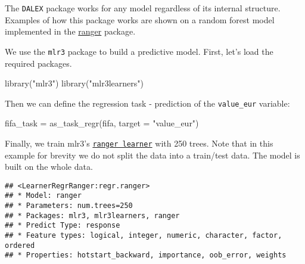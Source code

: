 \documentclass[
]{scrbook}
\newenvironment{Shaded}{\begin{snugshade}}{\end{snugshade}}
\newcommand{\AttributeTok}[1]{\textcolor[rgb]{0.77,0.63,0.00}{#1}}
\newcommand{\DecValTok}[1]{\textcolor[rgb]{0.00,0.00,0.81}{#1}}
\newcommand{\FunctionTok}[1]{\textcolor[rgb]{0.00,0.00,0.00}{#1}}
\newcommand{\NormalTok}[1]{#1}
\newcommand{\OtherTok}[1]{\textcolor[rgb]{0.56,0.35,0.01}{#1}}
\newcommand{\SpecialCharTok}[1]{\textcolor[rgb]{0.00,0.00,0.00}{#1}}
\newcommand{\StringTok}[1]{\textcolor[rgb]{0.31,0.60,0.02}{#1}}
\renewenvironment{Shaded} {\begin{snugshade}\small} {\end{snugshade}}
\begin{document}
The \texttt{DALEX} package works for any model regardless of its internal structure. Examples of how this package works are shown on a random forest model implemented in the \href{https://cran.r-project.org/package=ranger}{ranger} package.

We use the \texttt{mlr3} package to build a predictive model.
First, let's load the required packages.

\begin{Shaded}
\begin{Highlighting}[]
\FunctionTok{library}\NormalTok{(}\StringTok{"mlr3"}\NormalTok{)}
\FunctionTok{library}\NormalTok{(}\StringTok{"mlr3learners"}\NormalTok{)}
\end{Highlighting}
\end{Shaded}

Then we can define the regression task - prediction of the \texttt{value\_eur} variable:

\begin{Shaded}
\begin{Highlighting}[]
\NormalTok{fifa\_task }\OtherTok{=} \FunctionTok{as\_task\_regr}\NormalTok{(fifa, }\AttributeTok{target =} \StringTok{"value\_eur"}\NormalTok{)}
\end{Highlighting}
\end{Shaded}

Finally, we train mlr3's \href{https://mlr3learners.mlr-org.com/reference/mlr_learners_regr.ranger.html}{\texttt{ranger\ learner}} with 250 trees. Note that in this example for brevity we do not split the data into a train/test data. The model is built on the whole data.

\begin{Shaded}
\end{Shaded}

\begin{verbatim}
## <LearnerRegrRanger:regr.ranger>
## * Model: ranger
## * Parameters: num.trees=250
## * Packages: mlr3, mlr3learners, ranger
## * Predict Type: response
## * Feature types: logical, integer, numeric, character, factor, ordered
## * Properties: hotstart_backward, importance, oob_error, weights
\end{verbatim}
\end{document}

